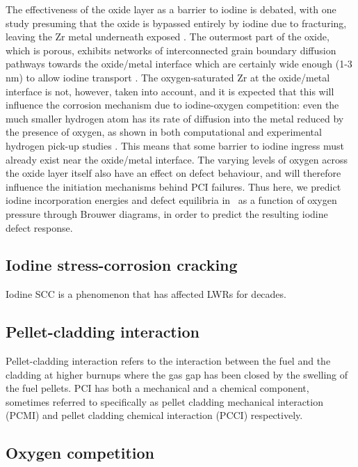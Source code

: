 The effectiveness of the oxide layer as a barrier to iodine is debated, with one study presuming that the oxide is bypassed entirely by iodine due to fracturing, leaving the Zr metal underneath exposed \cite{rossi2015first}. The outermost part of the oxide, which is porous, exhibits networks of interconnected grain boundary diffusion pathways towards the oxide/metal interface which are certainly wide enough (1-3 nm) to allow iodine transport \cite{ni2010porosity}. The oxygen-saturated Zr at the oxide/metal interface is not, however, taken into account, and it is expected that this will influence the corrosion mechanism due to iodine-oxygen competition: even the much smaller hydrogen atom has its rate of diffusion into the metal reduced by the presence of oxygen, as shown in both computational \cite{glazoff2014oxidation} and experimental hydrogen pick-up studies \cite{couet2014hydrogen}. This means that some barrier to iodine ingress must already exist near the oxide/metal interface. The varying levels of oxygen across the oxide layer itself also have an effect on defect behaviour, and will therefore influence the initiation mechanisms behind PCI failures. Thus here, we predict iodine incorporation energies and defect equilibria in \zirconia\ as a function of oxygen pressure through Brouwer diagrams, in order to predict the resulting iodine defect response.

\subsection{Iodine stress-corrosion cracking}

Iodine SCC is a phenomenon that has affected LWRs for decades.

\subsection{Pellet-cladding interaction}

Pellet-cladding interaction refers to the interaction between the fuel and the cladding at higher burnups where the gas gap has been closed by the swelling of the fuel pellets. PCI has both a mechanical and a chemical component, sometimes referred to specifically as pellet cladding mechanical interaction (PCMI) and pellet cladding chemical interaction (PCCI) respectively.

\subsection{Oxygen competition}

